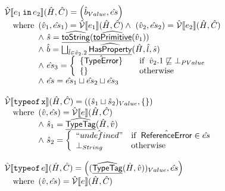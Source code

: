 \[\begin{array}{ll}
\hat{\mathcal{V}}\llbracket e_1\,\mbox{\texttt{in}}\,e_2\rrbracket (\hat{H},\hat{C}) = \left(\hat{b}_{Value},\hat{es}\right)\\
\quad{\rm where}\begin{array}[t]{l}
  (\hat{v}_1,\hat{es}_1)=\hat{\mathcal{V}}\llbracket e_1\rrbracket(\hat{H},\hat{C})
  \land\ (\hat{v}_2,\hat{es}_2)=\hat{\mathcal{V}}\llbracket e_2\rrbracket(\hat{H},\hat{C})\\
  \land\ \hat{s}=\widehat{\underline{\sf toString}}(\widehat{\underline{\sf toPrimitive}}(\hat{v}_1)) \\
  \land\ \hat{b} = \bigsqcup_{\hat{l}\in\hat{v}_2.2}\widehat{\underline{\sf HasProperty}}(\hat{H},\hat{l},\hat{s})\\
  \land\ \hat{es}_3 = \left\{
    \begin{array}{ll}
      \{\hat{{\sf TypeError}}\} & \quad{\rm if}\begin{array}[t]{l}\hat{v}_2.1\not\sqsubseteq \bot_{PValue}\end{array} \\
      \{\} & \quad{\rm otherwise} \\
    \end{array}
  \right.\\
  \land\ \hat{es} = \hat{es}_1 \sqcup \hat{es}_2 \sqcup \hat{es}_3
\end{array}
\\\\

\hat{\mathcal{V}}\llbracket \mbox{\texttt{typeof}}\,\mbox{\texttt{x}}\rrbracket (\hat{H},\hat{C}) = \left((\hat{s}_1 \sqcup \hat{s}_2)_{Value}, \left\{\begin{array}{l}\end{array}\right\}\right)\\
\quad{\rm where}\begin{array}[t]{l}
  (\hat{v},\hat{es}) = \hat{\mathcal{V}}\llbracket e\rrbracket(\hat{H},\hat{C}) \\
  \land\ \hat{s}_1 = \widehat{\underline{\sf TypeTag}}(\hat{H},\hat{v}) \\
  \land\ \hat{s}_2 = 
  \left\{\begin{array} {ll}
    \hat{``undefined"} & {\rm if}\begin{array}[t]{l}\hat{{\sf ReferenceError}} \in \hat{es}\end{array} \\
    \bot_{String}      & {\rm otherwise} \\
    \end{array}\right. \\
\end{array}
\\\\

\hat{\mathcal{V}}\llbracket \mbox{\texttt{typeof}}\,e\rrbracket (\hat{H},\hat{C}) = \left((\widehat{\underline{\sf TypeTag}}(\hat{H},\hat{v}))_{Value},\hat{es}\right)\\
\quad{\rm where}\begin{array}[t]{l}
  (\hat{v},\hat{es}) = \hat{\mathcal{V}}\llbracket e\rrbracket(\hat{H},\hat{C})
\end{array}
\\\\


\end{array}\]
